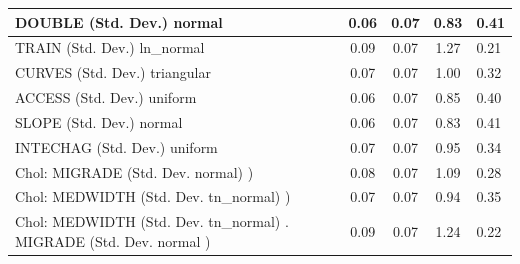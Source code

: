 \begin{table}
\begin{center}
\begin{tabular}{|l|l|c|c|c|l|}
			\hline
			DOUBLE (Std. Dev.) normal &  & 0.06 & 0.07 & 0.83 & 0.41 \\
			\hline
			TRAIN (Std. Dev.) ln_normal &  & 0.09 & 0.07 & 1.27 & 0.21 \\
			\hline
			CURVES (Std. Dev.) triangular &  & 0.07 & 0.07 & 1.00 & 0.32 \\
			\hline
			ACCESS (Std. Dev.) uniform &  & 0.06 & 0.07 & 0.85 & 0.40 \\
			\hline
			SLOPE (Std. Dev.) normal &  & 0.06 & 0.07 & 0.83 & 0.41 \\
			\hline
			INTECHAG (Std. Dev.) uniform &  & 0.07 & 0.07 & 0.95 & 0.34 \\
			\hline
			 Chol: MIGRADE (Std. Dev. normal) ) &  & 0.08 & 0.07 & 1.09 & 0.28 \\
			\hline
			 Chol: MEDWIDTH (Std. Dev. tn_normal) ) &  & 0.07 & 0.07 & 0.94 & 0.35 \\
			\hline
			 Chol: MEDWIDTH (Std. Dev. tn_normal) . MIGRADE (Std. Dev.   normal ) &  & 0.09 & 0.07 & 1.24 & 0.22 \\
			\hline
		\end{tabular}
	\end{center}
\end{table}